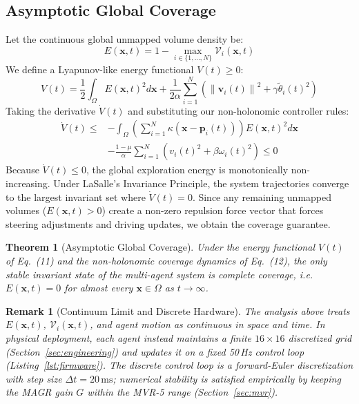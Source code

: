 \documentclass[journal,twoside]{IEEEtran}
\newtheorem{theorem}{Theorem}
\newtheorem{remark}{Remark}
\newcommand{\norm}[1]{\left\lVert#1\right\rVert}
\begin{document}
\subsection{Asymptotic Global Coverage}
Let the continuous global unmapped volume density be:
\begin{equation}
    E(\mathbf{x}, t) = 1 - \max_{i \in \{1,\dots,N\}} \mathcal{V}_i(\mathbf{x}, t)
\end{equation}
We define a Lyapunov-like energy functional $V(t) \geq 0$:
\begin{equation}
    V(t) = \frac{1}{2} \int_{\Omega} E(\mathbf{x}, t)^2 d\mathbf{x} + \frac{1}{2\alpha} \sum_{i=1}^N \left( \norm{\mathbf{v}_i(t)}^2 + \gamma \tilde{\theta}_i(t)^2 \right)
\end{equation}
Taking the derivative $\dot{V}(t)$ and substituting our non-holonomic controller rules:
\begin{align}
    \dot{V}(t) \leq & -\int_{\Omega} \left( \sum_{i=1}^N \kappa(\mathbf{x} - \mathbf{p}_i(t)) \right) E(\mathbf{x}, t)^2 d\mathbf{x} \nonumber \\
    & - \frac{1 - \mu}{\alpha} \sum_{i=1}^N \left( v_i(t)^2 + \beta \omega_i(t)^2 \right) \leq 0
\end{align}
Because $\dot{V}(t) \leq 0$, the global exploration energy is monotonically non-increasing. Under LaSalle's Invariance Principle, the system trajectories converge to the largest invariant set where $\dot{V}(t) = 0$. Since any remaining unmapped volumes ($E(\mathbf{x}, t) > 0$) create a non-zero repulsion force vector that forces steering adjustments and driving updates, we obtain the coverage guarantee.

\begin{theorem}[Asymptotic Global Coverage]
\label{thm:coverage}
Under the energy functional $V(t)$ of Eq.~(11) and the non-holonomic coverage dynamics of Eq.~(12), the only stable invariant state of the multi-agent system is complete coverage, i.e. $E(\mathbf{x}, t) = 0$ for almost every $\mathbf{x} \in \Omega$ as $t \to \infty$.
\end{theorem}

\begin{remark}[Continuum Limit and Discrete Hardware]
\label{rem:continuum}
The analysis above treats $E(\mathbf{x},t)$, $\mathcal{V}_i(\mathbf{x},t)$, and agent motion as continuous in space and time. In physical deployment, each agent instead maintains a finite $16 \times 16$ discretized grid (Section~\ref{sec:engineering}) and updates it on a fixed 50\,Hz control loop (Listing~\ref{lst:firmware}). The discrete control loop is a forward-Euler discretization with step size $\Delta t = 20\,\text{ms}$; numerical stability is satisfied empirically by keeping the MAGR gain $G$ within the MVR-5 range (Section~\ref{sec:mvr}).
\end{remark}
\end{document}
